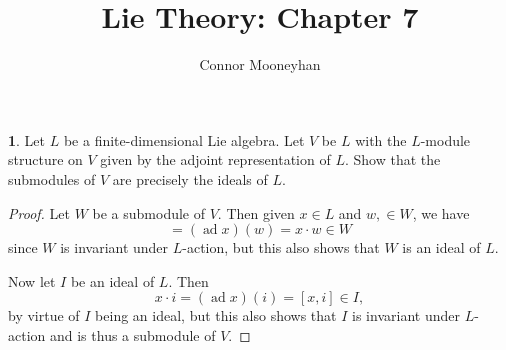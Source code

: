\documentclass[12pt]{article}
\title{Lie Theory: Chapter 7}
\author{Connor Mooneyhan}
\date{}
\DeclareMathOperator{\ad}{ad}
\theoremstyle{definition}
\newtheorem{ex}{}
\begin{document}
\maketitle

\begin{ex}
	Let $L$ be a finite-dimensional Lie algebra.
	Let $V$ be $L$ with the $L$-module structure on $V$ given by the adjoint representation of $L$.
	Show that the submodules of $V$ are precisely the ideals of $L$.
\end{ex}
\begin{proof}
    Let $W$ be a submodule of $V$.
    Then given $x \in L$ and $w, \in W$, we have \begin{equation*}
        [x, w] = (\ad x)(w) = x \cdot w \in W
    \end{equation*}
    since $W$ is invariant under $L$-action, but this also shows that $W$ is an ideal of $L$.

    Now let $I$ be an ideal of $L$.
    Then \begin{equation*}
        x \cdot i = (\ad x)(i) = [x, i] \in I,
    \end{equation*}
    by virtue of $I$ being an ideal, but this also shows that $I$ is invariant under $L$-action and is thus a submodule of $V$.
\end{proof}
\end{document}
